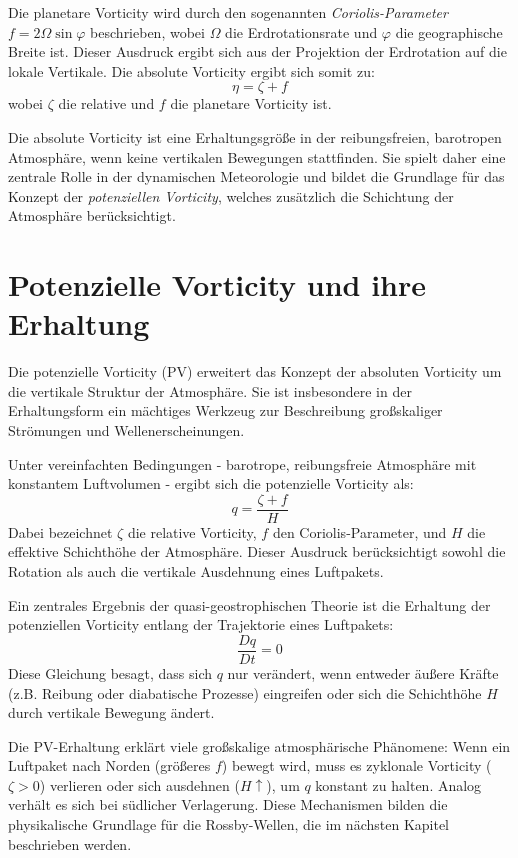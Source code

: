\begin{refsection}
    Die planetare Vorticity wird durch den sogenannten \emph{Coriolis-Parameter} \( f = 2 \Omega \sin \varphi \) beschrieben, wobei \( \Omega \) die Erdrotationsrate und \( \varphi \) die geographische Breite ist.  
    Dieser Ausdruck ergibt sich aus der Projektion der Erdrotation auf die lokale Vertikale.  
    Die absolute Vorticity ergibt sich somit zu:
    \[
    \eta = \zeta + f
    \]
    wobei \( \zeta \) die relative und \( f \) die planetare Vorticity ist.  
    
    Die absolute Vorticity ist eine Erhaltungsgröße in der reibungsfreien, barotropen Atmosphäre, wenn keine vertikalen Bewegungen stattfinden.  
    Sie spielt daher eine zentrale Rolle in der dynamischen Meteorologie und bildet die Grundlage für das Konzept der \emph{potenziellen Vorticity}, welches zusätzlich die Schichtung der Atmosphäre berücksichtigt.  
    
    \section{Potenzielle Vorticity und ihre Erhaltung}

Die potenzielle Vorticity (PV) erweitert das Konzept der absoluten Vorticity um die vertikale Struktur der Atmosphäre.  
Sie ist insbesondere in der Erhaltungsform ein mächtiges Werkzeug zur Beschreibung großskaliger Strömungen und Wellenerscheinungen.  

Unter vereinfachten Bedingungen - barotrope, reibungsfreie Atmosphäre mit konstantem Luftvolumen - ergibt sich die potenzielle Vorticity als:
\[
q = \frac{\zeta + f}{H}
\]
Dabei bezeichnet \( \zeta \) die relative Vorticity, \( f \) den Coriolis-Parameter, und \( H \) die effektive Schichthöhe der Atmosphäre.  
Dieser Ausdruck berücksichtigt sowohl die Rotation als auch die vertikale Ausdehnung eines Luftpakets.  

Ein zentrales Ergebnis der quasi-geostrophischen Theorie ist die Erhaltung der potenziellen Vorticity entlang der Trajektorie eines Luftpakets:
\[
\frac{Dq}{Dt} = 0
\]
Diese Gleichung besagt, dass sich \( q \) nur verändert, wenn entweder äußere Kräfte (z.B. Reibung oder diabatische Prozesse) eingreifen oder sich die Schichthöhe \( H \) durch vertikale Bewegung ändert.  

Die PV-Erhaltung erklärt viele großskalige atmosphärische Phänomene:  
Wenn ein Luftpaket nach Norden (größeres \( f \)) bewegt wird, muss es zyklonale Vorticity (\( \zeta > 0 \)) verlieren oder sich ausdehnen (\( H \uparrow \)), um \( q \) konstant zu halten.  
Analog verhält es sich bei südlicher Verlagerung.  
Diese Mechanismen bilden die physikalische Grundlage für die Rossby-Wellen, die im nächsten Kapitel beschrieben werden.  


\end{refsection}
